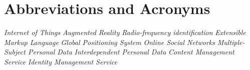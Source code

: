 \documentclass[conference]{IEEEtran}
\begin{document}

\section*{Abbreviations and Acronyms}
\begin{acronym}[Bash]
 {\textit{Internet of Things}}
 {\textit{Augmented Reality}}
 {\textit{Radio-frequency identification}}
 {\textit{Extensible Markup Language}}
 {\textit{Global Positioning System}}
 {\textit{Online Social Networks}}
 {\textit{Multiple-Subject Personal Data}}
 {\textit{Interdependent Personal Data}}
 {\textit{Content Management Service}}
 {\textit{Identity Management Service}}
\end{acronym}

\printbibliography
\end{document}

